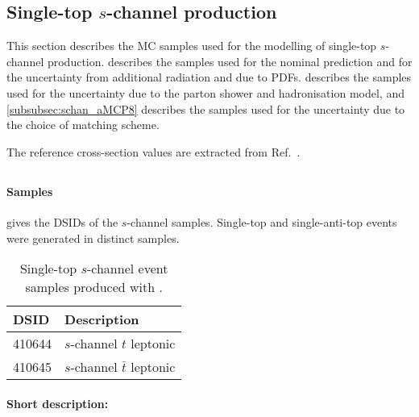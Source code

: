 \subsection{Single-top \texorpdfstring{$s$}{s}-channel production}
\label{subsec:schan}

This section describes the MC samples used for the modelling of single-top $s$-channel production.
 describes the \POWPY[8] samples used for the nominal prediction
and for the uncertainty from additional radiation and due to PDFs.
 describes the \POWHER[7] samples used for the uncertainty due to the parton shower and hadronisation model,
and \cref{subsubsec:schan_aMCP8} describes the \MGNLOPY[8] samples used for the uncertainty due to the choice of matching scheme.

The reference cross-section values are extracted from Ref.~\cite{LHCTopWGsgtopXsec}.

\subsection[Powheg+Pythia8]{\POWPY[8]}
\label{subsubsec:schan_PP8}

\paragraph{Samples}

 gives the DSIDs of the $s$-channel \POWPY[8] samples.
Single-top and single-anti-top events were generated in distinct samples.

\begin{table}[htbp]
  \caption{Single-top $s$-channel event samples produced with \POWPY[8].}%
  \label{tab:schan_PP8}
  \centering
  \begin{tabular}{l l}
    \toprule
    DSID & Description \\
    \midrule
    410644 & $s$-channel $t$ leptonic \\
    410645 & $s$-channel $\bar{t}$ leptonic \\
    \bottomrule
  \end{tabular}
\end{table}

\paragraph{Short description:}

